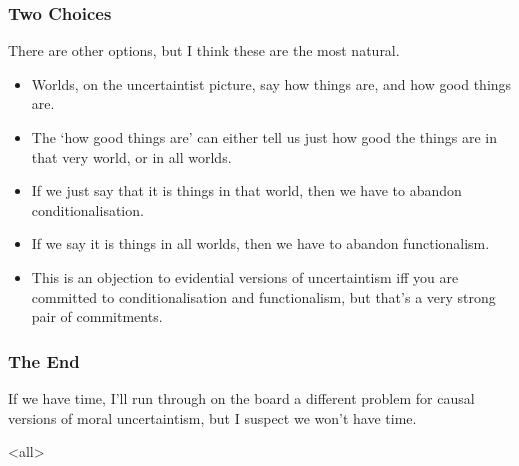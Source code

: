 \begin{frame}[fragile]
\frametitle{Two Choices}
\label{twochoices}

There are other options, but I think these are the most natural.

\begin{itemize}
\item{} Worlds, on the uncertaintist picture, say how things are, and how good things are.

\item{} The `how good things are' can either tell us just how good the things are in that very world, or in all worlds.

\item{} If we just say that it is things in that world, then we have to abandon conditionalisation.

\item{} If we say it is things in all worlds, then we have to abandon functionalism.

\item{} This is an objection to evidential versions of uncertaintism iff you are committed to conditionalisation and functionalism, but that's a very strong pair of commitments.

\end{itemize}

\end{frame}

\begin{frame}[fragile]
\frametitle{The End}
\label{theend}

If we have time, I'll run through on the board a different problem for causal versions of moral uncertaintism, but I suspect we won't have time.
\end{frame}

\mode<all>


\mode*

